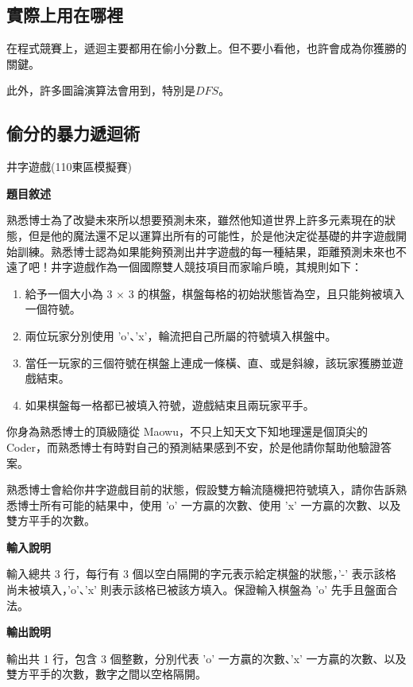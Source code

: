     \subsection{實際上用在哪裡}
    在程式競賽上，遞迴主要都用在偷小分數上。但不要小看他，也許會成為你獲勝的關鍵。

    此外，許多圖論演算法會用到，特別是$DFS$。

    \subsection{偷分的暴力遞迴術}

    \example 井字遊戲(110東區模擬賽)

    \textbf{題目敘述}
    
    熟悉博士為了改變未來所以想要預測未來，雖然他知道世界上許多元素現在的狀態，但是他的魔法還不足以運算出所有的可能性，於是他決定從基礎的井字遊戲開始訓練。熟悉博士認為如果能夠預測出井字遊戲的每一種結果，距離預測未來也不遠了吧！井字遊戲作為一個國際雙人競技項目而家喻戶曉，其規則如下：

    \begin{enumerate}
        \item 給予一個大小為 3 × 3 的棋盤，棋盤每格的初始狀態皆為空，且只能夠被填入一個符號。
        \item 兩位玩家分別使用 'o'、'x'，輪流把自己所屬的符號填入棋盤中。
        \item 當任一玩家的三個符號在棋盤上連成一條橫、直、或是斜線，該玩家獲勝並遊戲結束。
        \item 如果棋盤每一格都已被填入符號，遊戲結束且兩玩家平手。
    \end{enumerate}

    你身為熟悉博士的頂級隨從 Maowu，不只上知天文下知地理還是個頂尖的 Coder，而熟悉博士有時對自己的預測結果感到不安，於是他請你幫助他驗證答案。
    
    熟悉博士會給你井字遊戲目前的狀態，假設雙方輪流隨機把符號填入，請你告訴熟悉博士所有可能的結果中，使用 'o' 一方贏的次數、使用 'x' 一方贏的次數、以及雙方平手的次數。

    \textbf{輸入說明}

    輸入總共 3 行，每行有 3 個以空白隔開的字元表示給定棋盤的狀態，'-' 表示該格尚未被填入，'o'、'x' 則表示該格已被該方填入。保證輸入棋盤為 'o' 先手且盤面合法。

    \textbf{輸出說明}
    
    輸出共 1 行，包含 3 個整數，分別代表 'o' 一方贏的次數、'x' 一方贏的次數、以及雙方平手的次數，數字之間以空格隔開。

